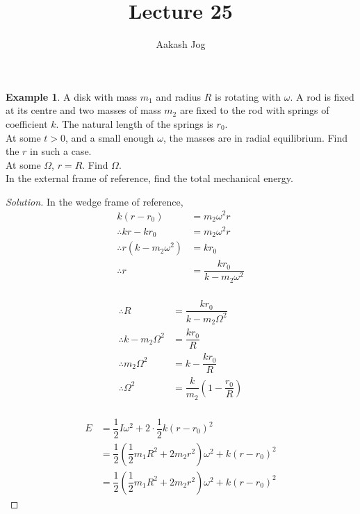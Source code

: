 \documentclass[fleqn, a4paper, 12pt]{amsart}
\title{Lecture 25}
\author{Aakash Jog}
\date{\formatdate{22}{1}{2015}}
\theoremstyle{definition}
\newtheorem{example}{Example}
\theoremstyle{theorem}
\newenvironment{solution}
{\begin{proof}[Solution]\let\qed\relax}
	{\end{proof}}
\begin{document}
\maketitle

\tableofcontents

\newpage
\section{}

\begin{example}
	A disk with mass $m_1$ and radius $R$ is rotating with $\omega$. A rod is fixed at its centre and two masses of mass $m_2$ are fixed to the rod with springs of coefficient $k$. The natural length of the springs is $r_0$.\\
	At some $t > 0$, and a small enough $\omega$, the masses are in radial equilibrium. Find the $r$ in such a case.\\
	At some $\Omega$, $r = R$. Find $\Omega$.\\
	In the external frame of reference, find the total mechanical energy.
\end{example}

\begin{solution}
	In the wedge frame of reference,
	\begin{align*}
		k (r - r_0) &= m_2 \omega^2 r\\
		\therefore k r - k r_0 &= m_2 \omega^2 r\\
		\therefore r (k - m_2 \omega^2) &= k r_0\\
		\therefore r &= \dfrac{k r_0}{k - m_2 \omega^2}
	\end{align*}
	~\\
	\begin{align*}
		\therefore R &= \dfrac{k r_0}{k - m_2 \Omega^2}\\
		\therefore k - m_2 \Omega^2 &= \dfrac{k r_0}{R}\\
		\therefore m_2 \Omega^2 &= k - \dfrac{k r_0}{R}\\
		\therefore \Omega^2 &= \dfrac{k}{m_2} \left( 1 - \dfrac{r_0}{R} \right)
	\end{align*}
	~\\
	\begin{align*}
		E &= \dfrac{1}{2} I \omega^2 + 2 \cdot \dfrac{1}{2} k (r - r_0)^2\\
		&= \dfrac{1}{2} \left( \dfrac{1}{2} m_1 R^2 + 2 m_2 r^2 \right) \omega^2 + k (r - r_0)^2\\
		&= \dfrac{1}{2} \left( \dfrac{1}{2} m_1 R^2 + 2 m_2 r^2 \right) \omega^2 + k (r - r_0)^2
	\end{align*}
\end{solution}
\end{document}
